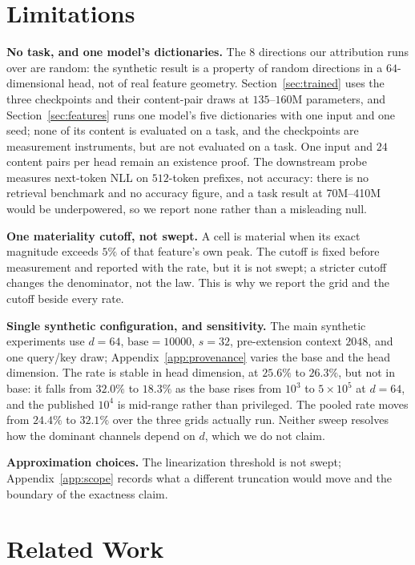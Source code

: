 \documentclass{article}
\theoremstyle{plain}
\theoremstyle{remark}
\begin{document}
\section{Limitations}

\textbf{No task, and one model's dictionaries.} The $8$ directions our
attribution runs over are random: the synthetic result is a property of random
directions in a $64$-dimensional head, not of real feature geometry.
Section~\ref{sec:trained} uses the three checkpoints and their content-pair
draws at $135$--$160$M parameters, and Section~\ref{sec:features} runs one
model's five dictionaries
with one input and one seed; none of its content is evaluated on a task, and the
checkpoints are measurement instruments, but are not evaluated on a task. One
input and $24$ content pairs per head remain an existence proof. The downstream
probe measures next-token NLL on $512$-token prefixes, not accuracy: there is no
retrieval benchmark and no accuracy figure, and a task result at 70M--410M would
be underpowered, so we report none rather than a misleading null.

\textbf{One materiality cutoff, not swept.} A cell is material when its exact
magnitude exceeds $5\%$ of that feature's own peak. The cutoff is fixed before
measurement and reported with the rate, but it is not swept; a stricter cutoff
changes the denominator, not the law. This is why we report the grid and the
cutoff beside every rate.

\textbf{Single synthetic configuration, and sensitivity.} The main synthetic
experiments use $d = 64$, $\mathrm{base} = 10000$, $s = 32$, pre-extension
context $2048$, and one query/key draw; Appendix~\ref{app:provenance} varies
the base and the head dimension. The rate is stable in head dimension,
at $25.6\%$ to $26.3\%$, but not in base: it falls from $32.0\%$ to $18.3\%$ as
the base rises from $10^{3}$ to $5\times10^{5}$ at $d = 64$, and the published
$10^{4}$ is mid-range rather than privileged. The pooled rate moves from
$24.4\%$ to $32.1\%$ over the three grids actually run. Neither sweep resolves
how the dominant channels depend on $d$, which we do not claim.

\textbf{Approximation choices.} The linearization threshold is not swept;
Appendix~\ref{app:scope} records what a different truncation would move and the
boundary of the exactness claim.

\section{Related Work}
\label{sec:related}
\end{document}
